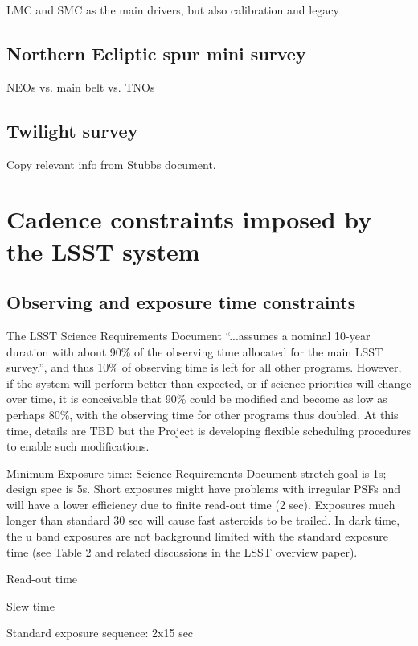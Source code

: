 \documentclass[DM,lsstdraft,toc,usenatbib]{lsstdoc}
\begin{document}
LMC and SMC as the main drivers, but also calibration and legacy 


\subsection{Northern Ecliptic spur mini survey}

NEOs vs. main belt vs. TNOs 


\subsection{Twilight survey} 

Copy relevant info from Stubbs document. 



\section{Cadence constraints imposed by the LSST system} 


\subsection{Observing and exposure time constraints}

The LSST Science Requirements Document  ``...assumes a nominal 10-year duration with about 90\% 
of the observing time allocated for the main LSST survey.'', and thus 10\% of observing time is left for 
all other programs. However, if the system will perform better than expected, or if science priorities 
will change over time, it is conceivable that 90\% could be modified and become as low as perhaps 80\%, 
with the observing time for other programs thus doubled. At this time, details are TBD but the Project
is developing flexible scheduling procedures to enable such modifications. 

Minimum Exposure time: Science Requirements Document stretch goal is 1s; design spec is 5s.
Short exposures might have problems with irregular PSFs and will have a lower efficiency due to
finite read-out time (2 sec). Exposures much longer than standard 30 sec will cause fast asteroids
to be trailed. In dark time, the u band exposures are not background limited with the standard
exposure time (see Table 2 and related discussions in the LSST overview paper). 

Read-out time 

Slew time 

Standard exposure sequence: 2x15 sec 
\end{document}
